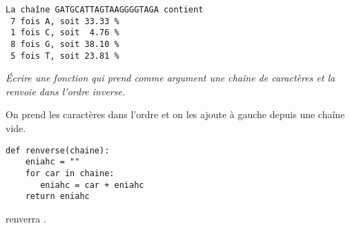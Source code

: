 \begin{lstlisting}
La chaîne GATGCATTAGTAAGGGGTAGA contient
 7 fois A, soit 33.33 %
 1 fois C, soit  4.76 %
 8 fois G, soit 38.10 %
 5 fois T, soit 23.81 %
\end{lstlisting}
\begin{Exercise}\it 
Écrire une fonction  qui prend comme argument une chaîne de caractères et la renvoie dans l'ordre inverse.
\end{Exercise}
\begin{Answer}
On prend les caractères dans l'ordre et on les ajoute à gauche depuis une chaîne vide.

\begin{lstlisting}
def renverse(chaine):
    eniahc = ""
    for car in chaine:
       eniahc = car + eniahc
    return eniahc
\end{lstlisting}
\end{Answer}
 renverra .
